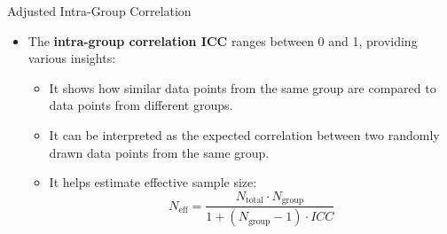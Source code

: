 \documentclass{beamer}
\begin{document}
\begin{frame}{Adjusted Intra-Group Correlation}
  \begin{itemize}
    \item The \textbf{intra-group correlation ICC}  ranges between 0 and 1, providing various insights:
    \begin{itemize}
      \item It shows how similar data points from the same group are compared to data points from different groups.
      \item It can be interpreted as the expected correlation between two randomly drawn data points from the same group.
      \item It helps estimate effective sample size: 
      \[
      N_{\text{eff}} = \frac{N_{\text{total}} \cdot N_{\text{group}}}{1 + (N_{\text{group}} - 1) \cdot ICC}
      \]
    \end{itemize}
  \end{itemize}
\end{frame}
\end{document}
